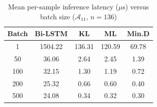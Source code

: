 
\begin{table}[t]
\caption{Mean per-sample inference latency ($\mu$s) versus batch size
($\mathcal{A}_{11}$, $n=136$)}
\centering
\renewcommand{\arraystretch}{1.15}
\setlength{\tabcolsep}{5pt}
\begin{tabular}{c|cccc}
\toprule
\textbf{Batch} & \textbf{Bi-LSTM} & \textbf{KL} & \textbf{ML} & \textbf{Min.D} \\
\midrule
1 & 1504.22 & 136.31 & 120.59 & 69.78 \\
50 & 36.06 & 2.64 & 2.45 & 1.39 \\
100 & 32.15 & 1.30 & 1.19 & 0.72 \\
200 & 25.32 & 0.66 & 0.60 & 0.40 \\
500 & 24.08 & 0.34 & 0.32 & 0.30 \\
\bottomrule
\end{tabular}
\label{Table:InferenceLatency}
\end{table}
